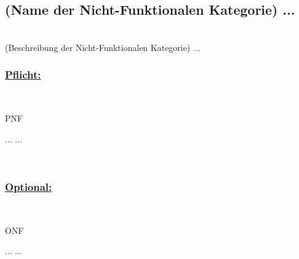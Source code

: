 %
%

\subsection{(Name der Nicht-Funktionalen Kategorie) ...}

~\\
(Beschreibung der Nicht-Funktionalen Kategorie) ...
\\

%
%
\subsubsection*{\underline{Pflicht:}}~\\

\begin{reqs}{PNF} 

	\req[ 1] ...
 	\req[10] ...
	
\end{reqs}

~\\


%
%
\subsubsection*{\underline{Optional:}}~\\


\begin{reqs}{ONF}

	\req[ 11] ...
 	\req[100] ...
	
\end{reqs}

~\\